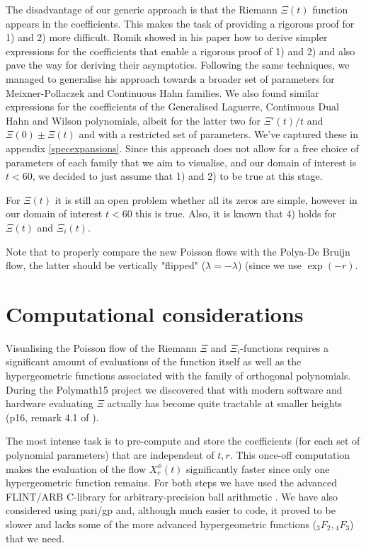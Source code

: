 \documentclass[a4paper,11pt,twoside]{amsart}
\begin{document}
The disadvantage of our generic approach is that the Riemann $\Xi(t)$ function appears in the coefficients. This makes the task of providing a rigorous proof for 1) and 2) more difficult. Romik showed in his paper how to derive simpler expressions for the coefficients that enable a rigorous proof of 1) and 2) and also pave the way for deriving their asymptotics. Following the same techniques, we managed to generalise his approach towards a broader set of parameters for Meixner-Pollaczek and Continuous Hahn families. We also found similar expressions for the coefficients of the Generalised Laguerre, Continuous Dual Hahn and Wilson polynomials, albeit for the latter two for $\Xi'(t)/t$ and $\Xi(0) \pm \Xi(t)$ and with a restricted set of parameters. We've captured these in appendix \ref{specexpansions}. Since this approach does not allow for a free choice of parameters of each family that we aim to visualise, and our domain of interest is $t < 60$, we decided to just assume that 1) and 2) to be true at this stage.

For $\Xi(t)$ it is still an open problem whether all its zeros are simple, however in our domain of interest $t < 60$ this is true. Also, it is known that 4) holds for $\Xi(t)$ and $\Xi_i(t)$.

Note that to properly compare the new Poisson flows with the Polya-De Bruijn flow, the latter should be vertically "flipped" ($\lambda = -\lambda$) (since we use  $\exp(-r)$.

\section{Computational considerations}\label{compcons}
Visualising the Poisson flow of the Riemann $\Xi$ and $\Xi_i$-functions requires a significant amount of evaluations of the function itself as well as the hypergeometric functions associated with the family of orthogonal polynomials. During the Polymath15 project we discovered that with modern software and hardware evaluating $\Xi$ actually has become quite tractable at smaller heights (p16, remark 4.1 of \cite{pol}). 

The most intense task is to pre-compute and store the coefficients (for each set of polynomial parameters) that are independent of $t, r$. This once-off computation makes the evaluation of the flow $X^\phi_r(t)$ significantly faster since only one hypergeometric function remains. For both steps we have used the advanced FLINT/ARB C-library for arbitrary-precision ball arithmetic \cite{arb}. We have also considered using pari/gp and, although much easier to code, it proved to be slower and lacks some of the more advanced hypergeometric functions (${}_3F_2,{}_4F_3$) that we need.
\end{document}
